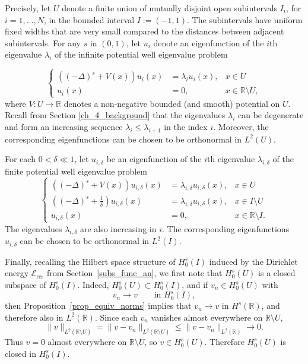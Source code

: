 \documentclass[preprint,12pt]{elsarticle}
\newcommand{\R}{\mathbb R}
\begin{document}
Precisely, let $U$ denote a finite union of mutually disjoint open subintervals $I_i$, for $i=1,\ldots,N$, in the bounded interval $I:=(-1,1)$. The subintervals have uniform fixed widths that are very small compared to the distances between adjacent subintervals. For any $s$ in $(0,1)$, let $u_i$ denote an eigenfunction of the $i$th eigenvalue $\lambda_i$ of the infinite potential well eigenvalue problem

\begin{equation}\label{evalue_problem_infinite_well}
 \left\{\begin{aligned}
        ((-\Delta)^s+V(x))u_i(x)&=\lambda_i u_i(x), &x\in U\\
        u_i(x)&=0, &x\in\R\setminus U,
       \end{aligned}
 \right.
\end{equation}
where $V:U\to\R$ denotes a non-negative bounded (and smooth) potential on $U$. Recall from Section \ref{ch_4_background} that the eigenvalues $\lambda_i$ can be degenerate and form an increasing sequence $\lambda_i\leq\lambda_{i+1}$ in the index $i$. 
Moreover, the corresponding eigenfunctions can be chosen to be orthonormal in $L^2(U)$. 

For each $0<\delta\ll 1$, let $u_{i,\delta}$ be an eigenfunction of the $i$th eigenvalue $\lambda_{i,\delta}$ of the finite potential well eigenvalue problem
\begin{equation}\label{evalue_problem_finite_well}
 \left\{\begin{aligned}
        ((-\Delta)^s+V(x))u_{i,\delta}(x)&=\lambda_{i,\delta} u_{i,\delta}(x), &x\in U\\
        \left((-\Delta)^s+\frac{1}{\delta}\right)u_{i,\delta}(x)&=\lambda_{i,\delta} u_{i,\delta}(x), &x\in I\setminus U\\
        u_{i,\delta}(x)&=0, &x\in\R\setminus I.
       \end{aligned}
 \right.
\end{equation}
The eigenvalues $\lambda_{i,\delta}$ are also 
increasing in $i$. The corresponding eigenfunctions $u_{i,\delta}$ can be chosen to be orthonormal in $L^2(I)$.

Finally, recalling the Hilbert space structure of $H_0^s(I)$ induced by the Dirichlet energy $\mathcal E_{\mathrm{res}}$ from Section~\ref{subs_func_an}, we first note that
$H_0^s(U)$ is a closed subspace of $H_0^s(I)$. Indeed,
$H_0^s(U)\subset H_0^s(I)$, and if
$v_n\in H_0^s(U)$ with
\[
    v_n\longrightarrow v
    \qquad\text{in }H_0^s(I),
\]
then Proposition~\ref{prop_equiv_norms} implies that
$v_n\to v$ in $H^s(\R)$, and therefore also in $L^2(\R)$. Since each
$v_n$ vanishes almost everywhere on $\R\setminus U$,
\[
    \|v\|_{L^2(\R\setminus U)}
    =
    \|v-v_n\|_{L^2(\R\setminus U)}
    \leq
    \|v-v_n\|_{L^2(\R)}
    \longrightarrow0.
\]
Thus $v=0$ almost everywhere on $\R\setminus U$, so
$v\in H_0^s(U)$. Therefore $H_0^s(U)$ is closed in $H_0^s(I)$.
\end{document}
